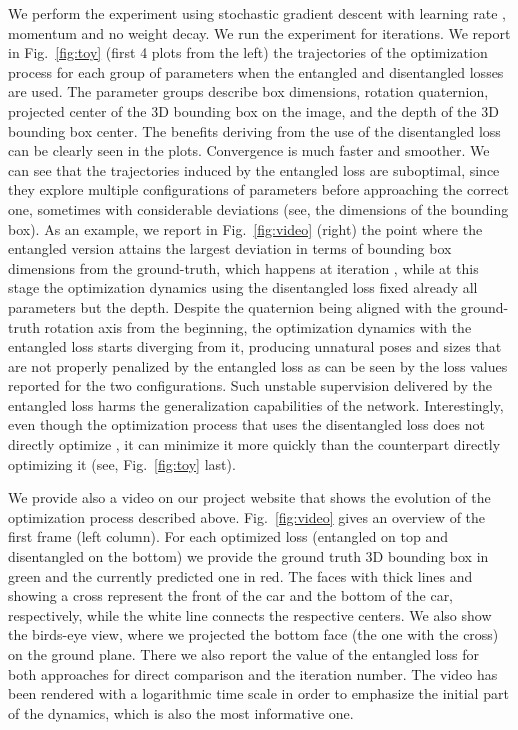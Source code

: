 \documentclass[10pt,twocolumn,letterpaper]{article}
\begin{document}
We perform the experiment using stochastic gradient descent with learning rate , momentum  and no weight decay. We run the experiment for  iterations. We report in Fig.~\ref{fig:toy} (first 4 plots from the left) the trajectories of the optimization process for each group of parameters when the entangled and disentangled losses are used. The parameter groups describe box dimensions, rotation quaternion, projected center of the 3D bounding box on the image, and the depth of the 3D bounding box center. The benefits deriving from the use of the disentangled loss can be clearly seen in the plots. Convergence is much faster and smoother. We can see that the trajectories induced by the entangled loss are suboptimal, since they explore multiple configurations of parameters before approaching the correct one, sometimes with considerable deviations (see, \eg the dimensions of the bounding box).
As an example, we report in Fig.~\ref{fig:video} (right) the point where the entangled version attains the largest deviation in terms of bounding box dimensions from the ground-truth, which happens at iteration , while at this stage the optimization dynamics using the disentangled loss fixed already all parameters but the depth. Despite the quaternion being aligned with the ground-truth rotation axis from the beginning, the optimization dynamics with the entangled loss starts diverging from it, producing unnatural poses and sizes that are not properly penalized by the entangled loss as can be seen by the loss values reported for the two configurations. Such unstable supervision delivered by the entangled loss harms the generalization capabilities of the network. Interestingly, even though the optimization process that uses the disentangled loss does not directly optimize , it can minimize it more quickly than the counterpart directly optimizing it (see, Fig.~\ref{fig:toy} last).


We provide also a video on our project website that shows the evolution of the optimization process described above. Fig.~\ref{fig:video} gives an overview of the first frame (left column). For each optimized loss (entangled on top and disentangled on the bottom) we provide the ground truth 3D bounding box in green and the currently predicted one in red. The faces with thick lines and showing a cross represent the front of the car and the bottom of the car, respectively, while the white line connects the respective centers. We also show the birds-eye view, where we projected the bottom face (the one with the cross) on the ground plane. There we also report the value of the entangled loss  for both approaches for direct comparison and the iteration number. The video has been rendered with a logarithmic time scale in order to emphasize the initial part of the dynamics, which is also the most informative one.
\end{document}

